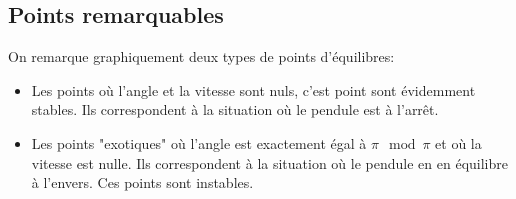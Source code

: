 \begin{center}
   \end{center}   
   \pagebreak

   \subsection{Points remarquables}
   On remarque graphiquement deux types de points d'équilibres:
      \begin{itemize}
      \item Les points où l'angle et la vitesse sont nuls, c'est point sont évidemment stables. Ils correspondent à la situation où le pendule est à l'arrêt.
      \item Les points "exotiques" où l'angle est exactement égal à \(\pi \mod \pi\) et où la vitesse est nulle. Ils correspondent à la situation où le pendule en en équilibre à l'envers. Ces points sont instables.
      \end{itemize} 

